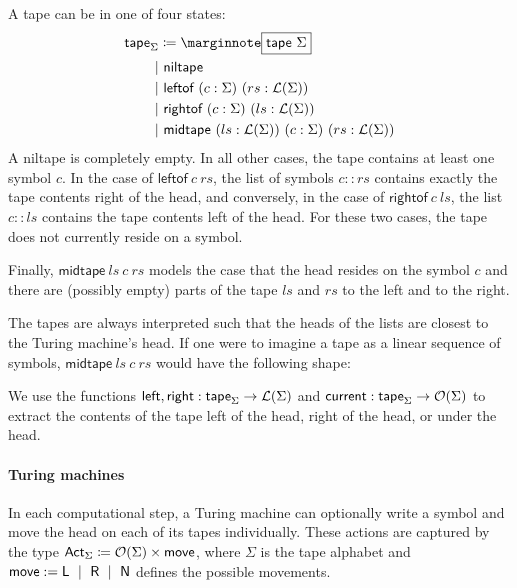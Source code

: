 A tape can be in one of four states:
\begin{align*}
  \textsf{tape}_\Sigma &  \defeq \mnote{$\textsf{tape}~\Sigma$}\\
  |&~\textsf{niltape} \\
  |&~\textsf{leftof}~(c : \Sigma)~(rs : \listsof{\Sigma}) \\
  |&~\textsf{rightof}~(c : \Sigma)~(ls : \listsof{\Sigma}) \\
  |&~\textsf{midtape}~(ls : \listsof{\Sigma})~(c : \Sigma)~(rs : \listsof{\Sigma})
\end{align*}
A \textsf{niltape} is completely empty. In all other cases, the tape contains at least one symbol $c$. 
In the case of $\textsf{leftof}~c~rs$, the list of symbols $c::rs$ contains exactly the tape contents right of the head, and conversely, in the case of $\textsf{rightof}~c~ls$, the list $c::ls$ contains the tape contents left of the head. For these two cases, the tape does not currently reside on a symbol.

Finally, $\textsf{midtape}~ls~c~rs$ models the case that the head resides on the symbol $c$ and there are (possibly empty) parts of the tape $ls$ and $rs$ to the left and to the right.

The tapes are always interpreted such that the heads of the lists are closest to the Turing machine's head. If one were to imagine a tape as a linear sequence of symbols, $\textsf{midtape}~ls~c~rs$ would have the following shape: 
\begin{center}
\end{center}

We use the functions $\textsf{left}, \textsf{right} : \textsf{tape}_\Sigma \rightarrow \mathcal{L} (\Sigma)$ and $\textsf{current} : \textsf{tape}_\Sigma \rightarrow \mathcal{O}{(\Sigma)}$ to extract the contents of the tape left of the head, right of the head, or under the head. 

\paragraph{Turing machines}
In each computational step, a Turing machine can optionally write a symbol and move the head on each of its tapes individually. These actions are captured by the type  $\textsf{Act}_{\Sigma} \coloneqq{} \mathcal{O}{(\Sigma)} \times \textsf{move}$, where $\Sigma$ is the tape alphabet and 
$\textsf{move} := \textsf{L} ~\mid~ \textsf{R} ~\mid~ \textsf{N}$
defines the possible movements. 

